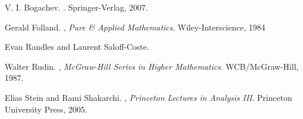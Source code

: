 \documentclass[11pt]{article}
\theoremstyle{theorem}
\begin{document}
\begin{thebibliography}{99}

V. I. Bogachev.
.
\newblock Springer-Verlag, 2007.

Gerald Folland.
, {\em Pure \& Applied Mathematics}.
\newblock Wiley-Interscience, 1984

Evan Randles and Laurent Saloff-Coste. 


Walter Rudin.
, {\em McGraw-Hill Series in Higher Mathematics}.
\newblock WCB/McGraw-Hill, 1987.

Elias Stein and Rami Shakarchi.
, {\em Princeton Lectures in Analysis III}.
\newblock Princeton University Press, 2005.

\end{thebibliography}
\end{document}
